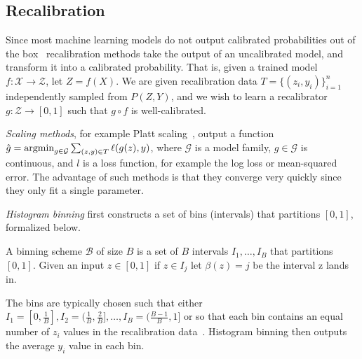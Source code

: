 \subsection{Recalibration}

Since most machine learning models do not output calibrated probabilities out of the box~\cite{guo2017calibration, zadrozny2001calibrated} recalibration methods take the output of an uncalibrated model, and transform it into a calibrated probability. That is, given a trained model $f: \mathcal{X} \to \mathcal{Z}$, let $Z = f(X)$. We are given recalibration data $T = \{ (z_i, y_i) \}_{i=1}^n$ independently sampled from $P(Z, Y)$, and we wish to learn a recalibrator $g : \mathcal{Z} \to [0, 1]$ such that $g \circ f$ is well-calibrated.

\emph{Scaling methods}, for example Platt scaling~\cite{platt1999probabilistic}, output a function $\hat{g} = \mathop{\mbox{argmin}}_{g \in \mathcal{G}} \sum_{(z, y) \in T} \ell(g(z), y)$, where $\mathcal{G}$ is a model family, $g \in \mathcal{G}$ is continuous, and $l$ is a loss function, for example the log loss or mean-squared error. The advantage of such methods is that they converge very quickly since they only fit a single parameter.

\emph{Histogram binning} first constructs a set of bins (intervals) that partitions $[0, 1]$, formalized below.

\begin{definition}
A binning scheme $\mathcal{B}$ of size $B$ is a set of $B$ intervals $I_1, \dots, I_B$ that partitions $[0, 1]$. Given an input $z \in [0, 1]$ if $z \in I_j$ let $\beta(z) = j$ be the interval z lands in.
\end{definition}

The bins are typically chosen such that either $I_1 = [0, \frac{1}{B}], I_2 = (\frac{1}{B}, \frac{2}{B}], \dots, I_B = (\frac{B-1}{B}, 1]$ or so that each bin contains an equal number of $z_i$ values in the recalibration data~\cite{zadrozny2001calibrated, guo2017calibration}. Histogram binning then outputs the average $y_i$ value in each bin.
